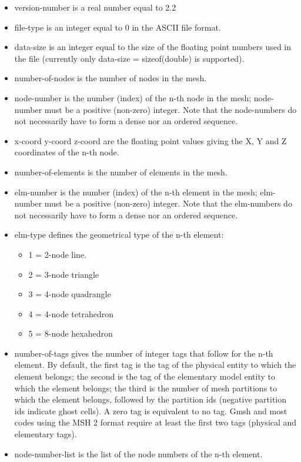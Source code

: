 \documentclass[dvipdfmx, 9pt, a4paper]{article}
\numberwithin{equation}{section}
\begin{document}
\begin{itemize}
\item version-number is a real number equal to 2.2
\item file-type is an integer equal to 0 in the ASCII file format.
\item data-size is an integer equal to the size of the floating point numbers used in the file (currently only data-size = sizeof(double) is supported).
\item number-of-nodes is the number of nodes in the mesh.
\item node-number is the number (index) of the n-th node in the mesh; node-number must be a positive (non-zero) integer. Note that the node-numbers do not necessarily have to form a dense nor an ordered sequence.
\item x-coord y-coord z-coord are the floating point values giving the X, Y and Z coordinates of the n-th node.
\item number-of-elements is the number of elements in the mesh.
\item elm-number is the number (index) of the n-th element in the mesh; elm-number must be a positive (non-zero) integer. Note that the elm-numbers do not necessarily have to form a dense nor an ordered sequence.
\item elm-type defines the geometrical type of the n-th element:
\begin{itemize}
\item 1 = 2-node line.
\item 2 = 3-node triangle
\item 3 = 4-node quadrangle
\item 4 = 4-node tetrahedron
\item 5 = 8-node hexahedron
\end{itemize}
\item number-of-tags gives the number of integer tags that follow for the n-th element. By default, the first tag is the tag of the physical entity to which the element belongs; the second is the tag of the elementary model entity to which the element belongs; the third is the number of mesh partitions to which the element belongs, followed by the partition ids (negative partition ids indicate ghost cells). A zero tag is equivalent to no tag. Gmsh and most codes using the MSH 2 format require at least the first two tags (physical and elementary tags).
\item node-number-list is the list of the node numbers of the n-th element.
\end{itemize}
\end{document}
